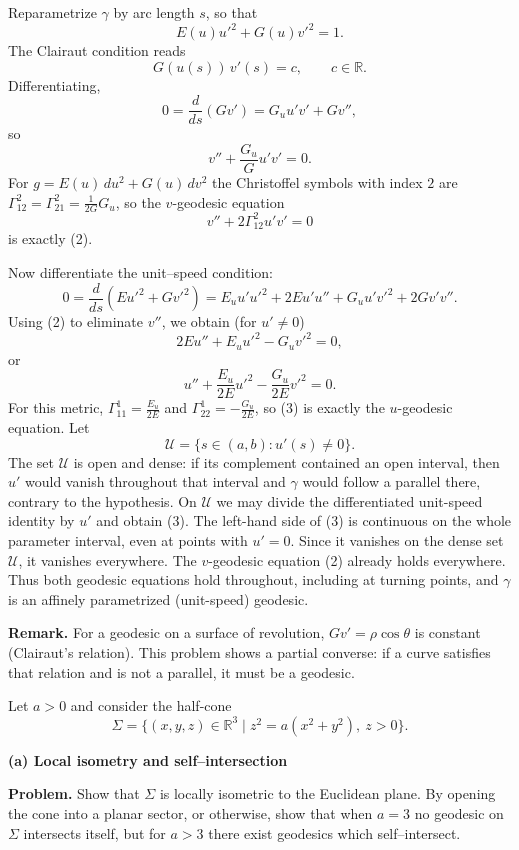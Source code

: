 \begin{solution}
Reparametrize $\gamma$ by arc length $s$, so that
\[
E(u)u'^2 + G(u)v'^2 = 1.
\]
The Clairaut condition reads
\[
G(u(s))\,v'(s) = c,\qquad c\in\mathbb R.
\tag{1}
\]
Differentiating,
\[
0 = \frac{d}{ds}(G v')
= G_u u' v' + G v'',
\]
so
\[
v'' + \frac{G_u}{G}u'v' = 0.
\tag{2}
\]
For $g=E(u)\,du^2+G(u)\,dv^2$ the Christoffel symbols with index $2$ are
$\Gamma^2_{12}=\Gamma^2_{21} = \frac{1}{2G}G_u$, so the $v$-geodesic equation
\[
v'' + 2\Gamma^2_{12}u'v' = 0
\]
is exactly (2).

Now differentiate the unit--speed condition:
\[
0 = \frac{d}{ds}(E u'^2 + G v'^2)
= E_u u' u'^2 + 2E u'u'' + G_u u' v'^2 + 2G v'v''.
\]
Using (2) to eliminate $v''$, we obtain (for $u'\neq0$)
\[
2E u'' + E_u u'^2 - G_u v'^2 = 0,
\]
or
\[
u'' + \frac{E_u}{2E}u'^2 - \frac{G_u}{2E}v'^2 = 0.
\tag{3}
\]
For this metric, $\Gamma^1_{11}=\frac{E_u}{2E}$ and
$\Gamma^1_{22}=-\frac{G_u}{2E}$, so (3) is exactly the $u$-geodesic
equation. Let
\[
\mathcal U=\{s\in(a,b):u'(s)\neq0\}.
\]
The set $\mathcal U$ is open and dense: if its complement contained an
open interval, then $u'$ would vanish throughout that interval and
$\gamma$ would follow a parallel there, contrary to the hypothesis.
On $\mathcal U$ we may divide the differentiated unit-speed identity by
$u'$ and obtain (3). The left-hand side of (3) is continuous on the
whole parameter interval, even at points with $u'=0$. Since it
vanishes on the dense set $\mathcal U$, it vanishes everywhere.
The $v$-geodesic equation (2) already holds everywhere. Thus both
geodesic equations hold throughout, including at turning points, and
$\gamma$ is an affinely parametrized (unit-speed) geodesic.

\medskip
\textbf{Remark.}
For a geodesic on a surface of revolution, $G v'=\rho\cos\theta$ is constant
(Clairaut's relation). This problem shows a partial converse: if a curve
satisfies that relation and is not a parallel, it must be a geodesic.

\end{solution}

\begin{problem}
\label{prob:cp-vii-0064}
Let $a>0$ and consider the half-cone
\[
\Sigma = \{(x,y,z)\in\mathbb R^3 \mid z^2 = a(x^2+y^2),\ z>0\}.
\]

\par\medskip\noindent\textbf{(a) Local isometry and self--intersection}\par\smallskip


\textbf{Problem.}
Show that $\Sigma$ is locally isometric to the Euclidean plane.
By opening the cone into a planar sector, or otherwise, show that
when $a=3$ no geodesic on $\Sigma$ intersects itself, but for $a>3$
there exist geodesics which self--intersect.

\medskip
\end{problem}


